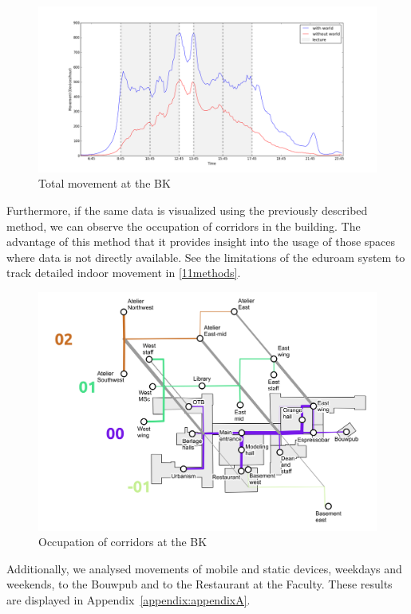 \begin{figure}[H]
\centering
\includegraphics[scale=0.35]{buildingpart_all_graph.png}
\captionsetup{justification=centering}
\caption{Total movement at the BK}
\label{figure:bk_total}
\end{figure}

Furthermore, if the same data is visualized using the previously described method, we can observe the occupation of corridors in the building. The advantage of this method that it provides insight into the usage of those spaces where data is not directly available. See the limitations of the
eduroam system to track detailed indoor movement in \autoref{11methods}.

\begin{figure}[H]
\centering
\includegraphics[scale=0.56]{bk_map_total.png}
\captionsetup{justification=centering}
\caption{Occupation of corridors at the BK}
\label{map:bk_total}
\end{figure}

Additionally, we analysed movements of mobile and static devices, weekdays and weekends, to the Bouwpub and to the Restaurant at the Faculty. These results are displayed in Appendix~\ref{appendix:appendixA}.
